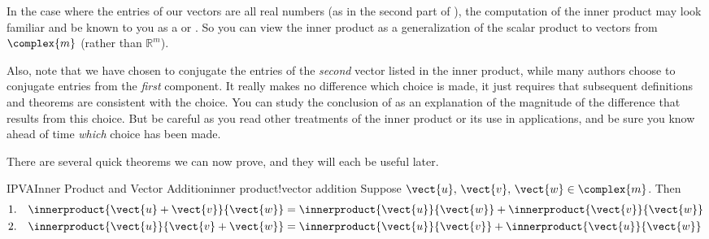 %
In the case where the entries of our vectors are all real numbers (as in the second part of ), the computation of the inner product may look familiar and be known to you as a  or .  So you can view the inner product as a generalization of the scalar product to vectors from $\complex{m}$ (rather than ${\mathbb R}^m$).\par
%
Also, note that we have chosen to conjugate the entries of the {\em second} vector listed in the inner product, while many authors choose to conjugate entries from the {\em first} component.  It really makes no difference which choice is made, it just requires that subsequent definitions and theorems are consistent with the choice.  You can study the conclusion of   as an explanation of the magnitude of the difference that results from this choice.  But be careful as you read other treatments of the inner product or its use in applications, and be sure you know ahead of time {\em which} choice has been made.\par
%
There are several quick theorems we can now prove, and they will each be useful later.
%
%
\begin{theorem}{IPVA}{Inner Product and Vector Addition}{inner product!vector addition}
Suppose $\vect{u},\,\vect{v},\,\vect{w}\in\complex{m}$.  Then
%
\begin{align*}
\text{1.}\quad\innerproduct{\vect{u}+\vect{v}}{\vect{w}}&=\innerproduct{\vect{u}}{\vect{w}}+\innerproduct{\vect{v}}{\vect{w}}\\
\text{2.}\quad\innerproduct{\vect{u}}{\vect{v}+\vect{w}}&=\innerproduct{\vect{u}}{\vect{v}}+\innerproduct{\vect{u}}{\vect{w}}
\end{align*}
%
\end{theorem}
%

